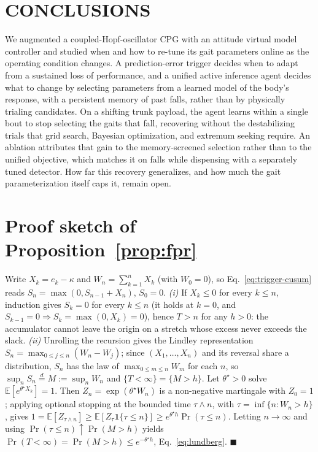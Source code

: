 \documentclass[letterpaper, 10 pt, conference]{ieeeconf}  %
\newcommand{\E}{\mathbb{E}}
\begin{document}
\section{CONCLUSIONS}

We augmented a coupled-Hopf-oscillator CPG with an attitude virtual model controller and studied when and how to re-tune its gait parameters online as the operating condition changes.
A prediction-error trigger decides when to adapt from a sustained loss of performance, and a unified active inference agent decides what to change by selecting parameters from a learned model of the body's response, with a persistent memory of past falls, rather than by physically trialing candidates.
On a shifting trunk payload, the agent learns within a single bout to stop selecting the gaits that fall, recovering without the destabilizing trials that grid search, Bayesian optimization, and extremum seeking require.
An ablation attributes that gain to the memory-screened selection rather than to the unified objective, which matches it on falls while dispensing with a separately tuned detector.
How far this recovery generalizes, and how much the gait parameterization itself caps it, remain open.


\appendix
\section{Proof sketch of Proposition~\ref{prop:fpr}}
\label{appx:fpr}

Write $X_k = e_k - \kappa$ and $W_n = \sum_{k=1}^{n} X_k$ (with $W_0=0$), so Eq.~\ref{eq:trigger-cusum} reads $S_n = \max(0, S_{n-1} + X_n)$, $S_0=0$.
\emph{(i)} If $X_k \leq 0$ for every $k \leq n$, induction gives $S_k = 0$ for every $k \leq n$ (it holds at $k=0$, and $S_{k-1}=0 \Rightarrow S_k = \max(0,X_k)=0$), hence $T>n$ for any $h>0$: the accumulator cannot leave the origin on a stretch whose excess never exceeds the slack.
\emph{(ii)} Unrolling the recursion gives the Lindley representation $S_n = \max_{0 \leq j \leq n}(W_n - W_j)$; since $(X_1,\dots,X_n)$ and its reversal share a distribution, $S_n$ has the law of $\max_{0\leq m\leq n} W_m$ for each $n$, so $\sup_n S_n \overset{d}{=} M := \sup_n W_n$ and $\{T<\infty\} = \{M>h\}$.
Let $\theta^{\star}>0$ solve $\E[e^{\theta^{\star} X_k}]=1$.
Then $Z_n = \exp(\theta^{\star} W_n)$ is a non-negative martingale with $Z_0=1$; applying optional stopping at the bounded time $\tau \wedge n$, with $\tau = \inf\{n : W_n > h\}$, gives $1 = \E[Z_{\tau \wedge n}] \geq \E[Z_\tau \mathbf{1}\{\tau\leq n\}] \geq e^{\theta^{\star} h}\Pr(\tau \leq n)$.
Letting $n \to \infty$ and using $\Pr(\tau \leq n) \uparrow \Pr(M>h)$ yields $\Pr(T<\infty) = \Pr(M>h) \leq e^{-\theta^{\star} h}$, Eq.~\ref{eq:lundberg}. \hfill$\blacksquare$
\end{document}
